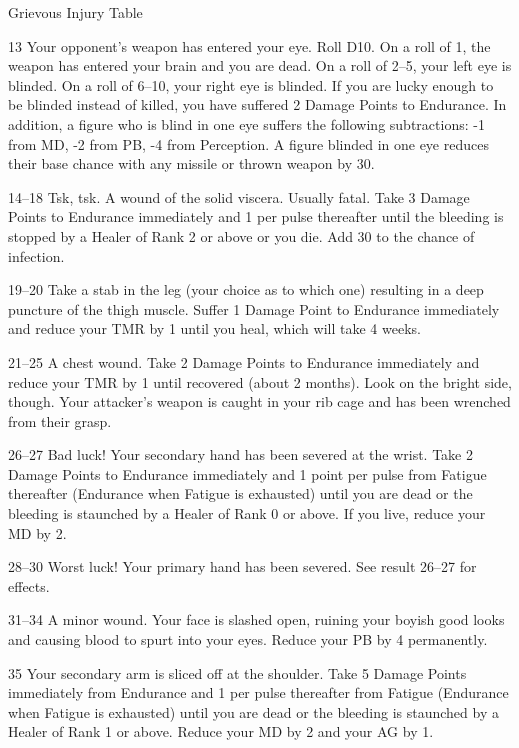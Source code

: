 \begin{Chapter}{Grievous Injury Table}
\begin{Description}
\item[13] Your opponent’s weapon has entered your eye. Roll D10. On a
  roll of 1, the weapon has entered your brain and you are dead.  On a
  roll of 2–5, your left eye is blinded.  On a roll of 6–10, your
  right eye is blinded. If you are lucky enough to be blinded instead
  of killed, you have suffered 2 Damage Points to Endurance. In
  addition, a figure who is blind in one eye suffers the following
  subtractions: -1 from MD, -2 from PB, -4 from Perception. A figure
  blinded in one eye reduces their base chance with any missile or
  thrown weapon by 30.

\item[14–18] Tsk, tsk. A wound of the solid viscera.  Usually
  fatal. Take 3 Damage Points to Endurance immediately and 1 per pulse
  thereafter until the bleeding is stopped by a Healer of Rank 2 or
  above or you die.  Add 30 to the chance of infection.

\item[19–20] Take a stab in the leg (your choice as to which one)
  resulting in a deep puncture of the thigh muscle. Suffer 1 Damage
  Point to Endurance immediately and reduce your TMR by 1 until you
  heal, which will take 4 weeks.

\item[21–25] A chest wound. Take 2 Damage Points to Endurance
  immediately and reduce your TMR by 1 until recovered (about 2
  months). Look on the bright side, though.  Your attacker’s weapon is
  caught in your rib cage and has been wrenched from their grasp.

\item[26–27] Bad luck! Your secondary hand has been severed at the
  wrist. Take 2 Damage Points to Endurance immediately and 1 point per
  pulse from Fatigue thereafter (Endurance when Fatigue is exhausted)
  until you are dead or the bleeding is staunched by a Healer of Rank
  0 or above. If you live, reduce your MD by 2.

\item[28–30] Worst luck!  Your primary hand has been severed. See
  result 26–27 for effects.

\item[31–34] A minor wound. Your face is slashed open, ruining your
  boyish good looks and causing blood to spurt into your eyes.  Reduce
  your PB by 4 permanently.

\item[35] Your secondary arm is sliced off at the shoulder. Take 5
  Damage Points immediately from Endurance and 1 per pulse thereafter
  from Fatigue (Endurance when Fatigue is exhausted) until you are
  dead or the bleeding is staunched by a Healer of Rank 1 or
  above. Reduce your MD by 2 and your AG by 1.


\end{Description}
\end{Chapter}
